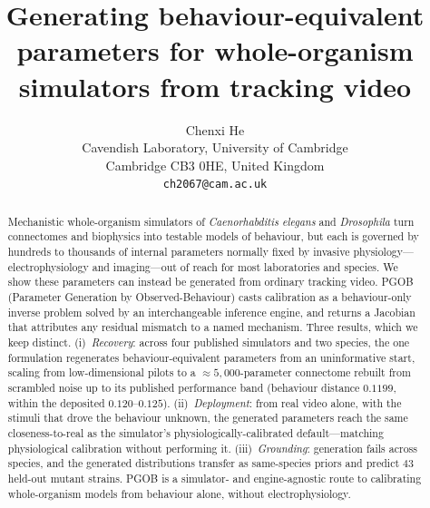 \documentclass[11pt]{article}
\title{Generating behaviour-equivalent parameters for whole-organism simulators from tracking video}
\author{
 Chenxi He \\
 Cavendish Laboratory, University of Cambridge \\
 Cambridge CB3 0HE, United Kingdom \\
 \texttt{ch2067@cam.ac.uk}
}
\date{}
\begin{document}
\maketitle

\begin{abstract}
\noindent
Mechanistic whole-organism simulators of \emph{Caenorhabditis elegans} and \emph{Drosophila} turn connectomes and biophysics into testable models of behaviour, but each is governed by hundreds to thousands of internal parameters normally fixed by invasive physiology---electrophysiology and imaging---out of reach for most laboratories and species. We show these parameters can instead be generated from ordinary tracking video. PGOB (Parameter Generation by Observed-Behaviour) casts calibration as a behaviour-only inverse problem solved by an interchangeable inference engine, and returns a Jacobian that attributes any residual mismatch to a named mechanism. Three results, which we keep distinct. (i)~\emph{Recovery}: across four published simulators and two species, the one formulation regenerates behaviour-equivalent parameters from an uninformative start, scaling from low-dimensional pilots to a ${\approx}5{,}000$-parameter connectome rebuilt from scrambled noise up to its published performance band (behaviour distance $0.1199$, within the deposited $0.120$--$0.125$). (ii)~\emph{Deployment}: from real video alone, with the stimuli that drove the behaviour unknown, the generated parameters reach the same closeness-to-real as the simulator's physiologically-calibrated default---matching physiological calibration without performing it. (iii)~\emph{Grounding}: generation fails across species, and the generated distributions transfer as same-species priors and predict $43$ held-out mutant strains. PGOB is a simulator- and engine-agnostic route to calibrating whole-organism models from behaviour alone, without electrophysiology.
\end{abstract}
\end{document}
